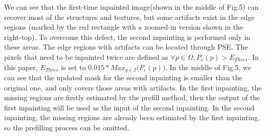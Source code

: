 We can see that the first-time inpainted image(shown in the middle of Fig.5) can recover most of the structures and textures, but some artifacts exist in the edge regions (marked by the red rectangle with a zoomed-in version shown in the right-top). To overcome this defect, the second inpainting is performed only in these areas. The edge regions with artifacts can be located through PSE. The pixels that need to be inpainted twice are defined as \(\forall p \in \Omega, P_e(p)>E_{Thres}\). In this paper, \(E_{Thres}\) is set to \(0.015*Max_{q\in{I}}{(P_e(p)})\). In the middle of Fig.5, we can see that the updated mask for the second inpainting is smaller than the original one, and only covers those areas with artifacts. In the first inpainting, the missing regions are firstly estimated by the prefill method, then the output of the first inpainting will be used as the input of the second inpainting. In the second inpainting, the missing regions are already been estimated by the first inpainting, so the prefilling process can be omitted.
 


